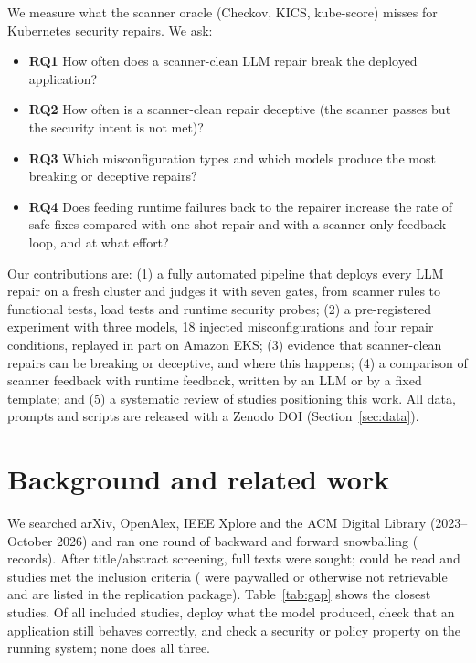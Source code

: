 \documentclass[10pt]{article}
\begin{document}
We measure what the scanner oracle (Checkov, KICS, kube-score) misses for Kubernetes security repairs. We ask:
\begin{itemize}
  \item \textbf{RQ1} How often does a scanner-clean LLM repair break the deployed application?
  \item \textbf{RQ2} How often is a scanner-clean repair deceptive (the scanner passes but the security intent is not met)?
  \item \textbf{RQ3} Which misconfiguration types and which models produce the most breaking or deceptive repairs?
  \item \textbf{RQ4} Does feeding runtime failures back to the repairer increase the rate of safe fixes compared with
        one-shot repair and with a scanner-only feedback loop, and at what effort?
\end{itemize}
Our contributions are: (1) a fully automated pipeline that deploys every LLM repair on a fresh cluster and judges it
with seven gates, from scanner rules to functional tests, load tests and runtime security probes; (2) a pre-registered
experiment with three models, 18 injected misconfigurations and four repair conditions, replayed in part on Amazon EKS;
(3) evidence that scanner-clean repairs can be breaking or deceptive, and where this happens; (4) a comparison of
scanner feedback with runtime feedback, written by an LLM or by a fixed template; and (5) a systematic review of
\LitIncluded{} studies positioning this work. All data, prompts and scripts are released with a Zenodo DOI (Section~\ref{sec:data}).

\section{Background and related work}\label{sec:related}
We searched arXiv, OpenAlex, IEEE Xplore and the ACM Digital Library (2023--October 2026) and ran one round of backward
and forward snowballing (\LitRecords{} records). After title/abstract screening, \LitFullTextSought{} full texts were
sought; \LitFullTextAssessed{} could be read and \LitIncluded{} studies met the inclusion criteria
(\LitNotRetrieved{} were paywalled or otherwise not retrievable and are listed in the replication package).
Table~\ref{tab:gap} shows the closest studies. Of all included studies, \LitDeploys{} deploy what the model produced,
\LitAppBehaviour{} check that an application still behaves correctly, and \LitRuntimeIntent{} check a security or policy
property on the running system; none does all three.
\end{document}
